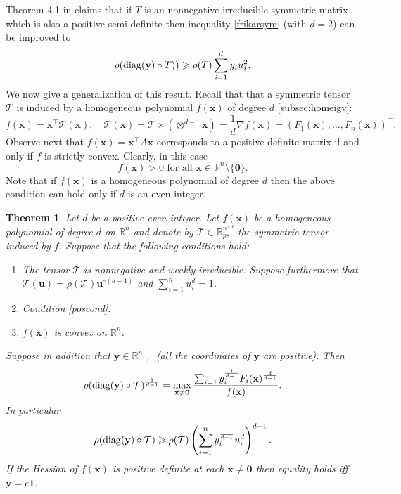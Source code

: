 \documentclass{amsart}
\newcommand{\diag}{\operatorname{diag}}
\newcommand{\R}{\mathbb{R}}
\newcommand{\uu}{\mathbf{u}}
\newcommand{\x}{\mathbf{x}}
\newcommand{\y}{\mathbf{y}}
\newcommand{\0}{\mathbf{0}}
\newcommand{\1}{\mathbf{1}}
\newcommand{\cT}{\mathcal{T}}
\def\diag{\mathop{{\rm diag}}\nolimits}
\newcommand{\trans}{^\top}
\newtheorem{theorem}[theo]{Theorem}
\theoremstyle{remark}
\numberwithin{equation}{section} %
\renewcommand{\ge}{\geqslant}
\begin{document}
 Theorem 4.1 in \cite{FK75} claims that if $T$ is an nonnegative irreducible symmetric matrix which is also a positive semi-definite then inequality
 \eqref{frikarsym}  (with $d=2$) can be improved to 
 \[\rho(\diag(\y)\circ T))\ge \rho(T)\sum_{i=1}^d y_i u_i^2.\]
 We now give a generalization of this result.
{{Recall that  that a symmetric tensor $\cT$ is induced by a homogeneous polynomial $f(\x)$ of degree $d$ \ref{subsec:homeigv}}}:
 {{\[f(\x)=\x\trans \cT(\x), \quad \cT(\x) =\cT\times(\otimes^{d-1}\x)=\frac{1}{d}\nabla f(\x)=(F_1(\x),\ldots,F_n(\x))\trans.\]}}
 Observe next that $f(\x)=\x\trans A\x$ corresponds to a positive definite matrix if and only if $f$ is strictly convex.
 Clearly, in this case 
 \begin{equation}\label{poscond}
 f(\x)>0 \textrm{ for all } \x\in\R^n\setminus\{\0\}.
 \end{equation}
Note that if $f(\x)$ is a homogeneous polynomial of degree $d$ then the above condition can hold only if $d$ is an even integer.
\begin{theorem}\label{genKFsc}  Let $d$ be a positive even integer.  Let $f(\x)$ be a homogeneous polynomial of degree $d$  on $\R^n$ and denote by $\cT\in\R_{ps}^{n^{\times d}}$ 
the symmetric tensor induced by $f$.  
Suppose that the following conditions hold: 
\begin{enumerate}
\item The tensor $\cT$  is nonnegative and weakly irreducible.  Suppose furthermore that 
$\cT(\uu)=\rho(\cT)\uu^{\circ (d-1)}$ and $\sum_{i=1}^n u_i^d=1$.
\item Condition \eqref{poscond}.
\item $f(\x)$ is convex on $\R^n$. 
\end{enumerate}
Suppose in addition that $\y\in\R_{++}^n$ (all the coordinates of $\y$ are positive).  Then
\begin{equation}\label{maxcharrhoyT}
  \rho(\diag(\y)\circ \cT)^{\frac{1}{d-1}}=\max_{\x\ne \0} \frac{\sum_{i=1} y_i^{\frac{1}{d-1}}F_i(\x)^{\frac{d}{d-1}}}{f(\x)}.
%
\end{equation}
In particular
 \begin{equation}\label{frikarsym2}
 \rho(\diag(\y)\circ \cT)\ge \rho(\cT)\left(\sum_{i=1}^n y_i^{\frac{1}{d-1}}{u_i^d}\right)^{d-1}.
 \end{equation}
 If the Hessian of $f(\x)$ is positive definite at each $\x\ne \0$ then equality holds iff $\y=c\1$.
\end{theorem} 
\end{document}
